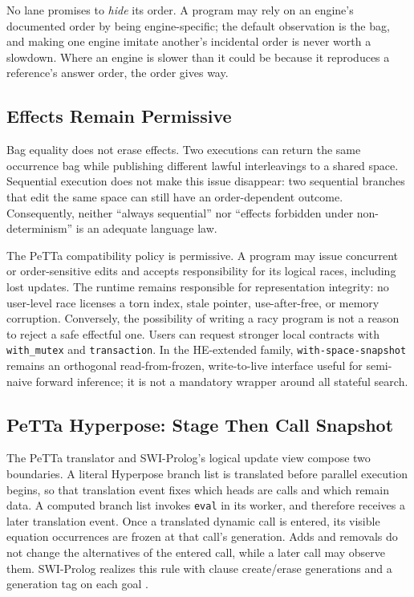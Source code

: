 \documentclass[11pt]{article}
\newcommand{\code}[1]{\texttt{#1}}
\newcommand{\PeTTa}{\textup{PeTTa}}
\begin{document}
No lane promises to \emph{hide} its order.  A program may rely on an
engine's documented order by being engine-specific; the default observation
is the bag, and making one engine imitate another's incidental order is
never worth a slowdown.  Where an engine is slower than it could be because
it reproduces a reference's answer order, the order gives way.

\subsection{Effects Remain Permissive}

Bag equality does not erase effects.  Two executions can return the same
occurrence bag while publishing different lawful interleavings to a shared
space.  Sequential execution does not make this issue disappear: two
sequential branches that edit the same space can still have an
order-dependent outcome.  Consequently, neither ``always sequential'' nor
``effects forbidden under non-determinism'' is an adequate language law.

The \PeTTa{} compatibility policy is permissive.  A program may issue
concurrent or order-sensitive edits and accepts responsibility for its
logical races, including lost updates.  The runtime remains responsible for
representation integrity: no user-level race licenses a torn index, stale
pointer, use-after-free, or memory corruption.  Conversely, the possibility
of writing a racy program is not a reason to reject a safe effectful one.
Users can request stronger local contracts with \code{with\_mutex} and
\code{transaction}.  In the HE-extended family,
\code{with-space-snapshot} remains an orthogonal read-from-frozen,
write-to-live interface useful for semi-naive forward inference; it is not a
mandatory wrapper around all stateful search.

\subsection{\PeTTa{} Hyperpose: Stage Then Call Snapshot}

The \PeTTa{} translator and SWI-Prolog's logical update view compose two
boundaries.  A literal Hyperpose branch list is translated before parallel
execution begins, so that translation event fixes which heads are calls and
which remain data.  A computed branch list invokes \code{eval} in its worker,
and therefore receives a later translation event.  Once a translated dynamic
call is entered, its visible equation occurrences are frozen at that call's
generation.  Adds and removals do not change the alternatives of the entered
call, while a later call may observe them.  SWI-Prolog realizes this rule with
clause create/erase generations and a generation tag on each goal
\cite{swi-update-view}.
\end{document}
